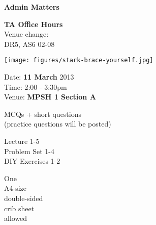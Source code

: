 \begin{cf}{
		\textbf{Admin Matters}
}
\end{cf}

\begin{cf}{
		\textbf{TA Office Hours}\\
		Venue change:\\
		DR5, AS6 02-08
}
\end{cf}

\begin{cf}{
		\texttt{[image: figures/stark-brace-yourself.jpg]}
}
\end{cf}

\begin{cf}
		Date: \textbf{11 March} 2013\\
		Time: 2:00 - 3:30pm\\
		Venue: \textbf{\color{red} MPSH 1 Section A}\\
\end{cf}

\begin{cf}
MCQs + short questions\\
(practice questions will be posted)
\end{cf}

\begin{cf}
Lecture 1-5\\
Problem Set 1-4\\
DIY Exercises 1-2\\
\end{cf}

\begin{cf}
		One\\
		A4-size\\
		double-sided\\
		crib sheet\\
		allowed
\end{cf}
